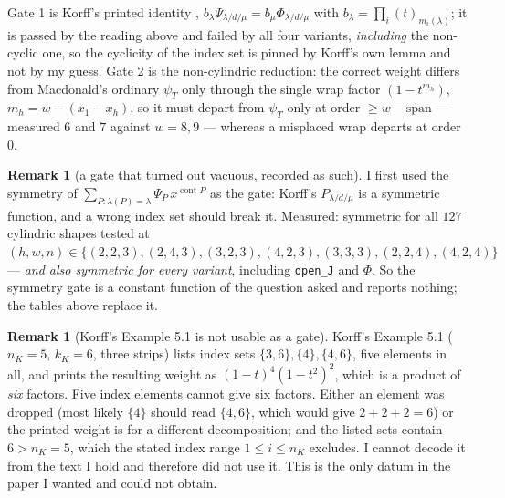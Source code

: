 \documentclass[11pt]{article}
\theoremstyle{definition}
\newtheorem{remark}[theorem]{Remark}
\DeclareMathOperator{\cont}{cont}
\newcommand{\la}{\lambda}
\begin{document}
Gate 1 is Korff's printed identity \cite[(5.16)]{K},
$b_\la\Psi_{\la/d/\mu}=b_\mu\Phi_{\la/d/\mu}$ with
$b_\la=\prod_i (t)_{m_i(\la)}$; it is passed by the reading above and failed by
all four variants, \emph{including} the non-cyclic one, so the cyclicity of the
index set is pinned by Korff's own lemma and not by my guess. Gate 2 is the
non-cylindric reduction: the correct weight differs from Macdonald's ordinary
$\psi_T$ only through the single wrap factor $(1-t^{m_h})$,
$m_h=w-(x_1-x_h)$, so it must depart from $\psi_T$ only at order
$\ge w-\mathrm{span}$ --- measured $6$ and $7$ against $w=8,9$ --- whereas a
misplaced wrap departs at order $0$.

\begin{remark}[a gate that turned out vacuous, recorded as such]
I first used the symmetry of $\sum_{P:\la(P)=\la}\Psi_P\,x^{\cont P}$ as the
gate: Korff's $P_{\la/d/\mu}$ is a symmetric function, and a wrong index set
should break it. Measured: symmetric for all $127$ cylindric shapes tested at
$(h,w,n)\in\{(2,2,3),(2,4,3),(3,2,3),(4,2,3),(3,3,3),(2,2,4),(4,2,4)\}$ ---
\emph{and also symmetric for every variant}, including \texttt{open\_J} and
$\Phi$. So the symmetry gate is a constant function of the question asked and
reports nothing; the tables above replace it.
\end{remark}

\begin{remark}[Korff's Example 5.1 is not usable as a gate]
Korff's Example 5.1 ($n_K=5$, $k_K=6$, three strips) lists index sets
$\{3,6\},\{4\},\{4,6\}$, five elements in all, and prints the resulting weight
as $(1-t)^4(1-t^2)^2$, which is a product of \emph{six} factors. Five index
elements cannot give six factors. Either an element was dropped (most likely
$\{4\}$ should read $\{4,6\}$, which would give $2+2+2=6$) or the printed
weight is for a different decomposition; and the listed sets contain $6>n_K=5$,
which the stated index range $1\le i\le n_K$ excludes. I cannot decode it from
the text I hold and therefore did not use it. This is the only datum in the
paper I wanted and could not obtain.
\end{remark}
\end{document}
